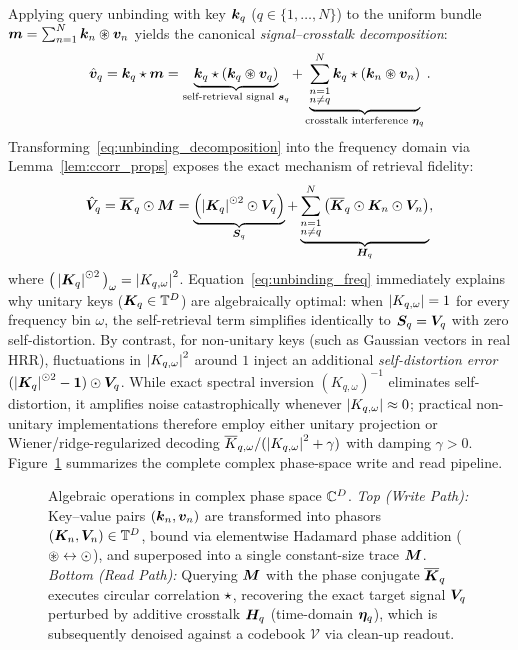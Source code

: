 Applying query unbinding with key $\boldsymbol{k}_q$ ($q \in \{1, \dots, N\}$) to the uniform bundle $\boldsymbol{m} = \sum_{n=1}^{N} \boldsymbol{k}_n \circledast \boldsymbol{v}_n$ yields the canonical \emph{signal--crosstalk decomposition}:
\begin{equation}\label{eq:unbinding_decomposition}
    \hat{\boldsymbol{v}}_q = \boldsymbol{k}_q \star \boldsymbol{m}
    = \underbrace{\boldsymbol{k}_q \star (\boldsymbol{k}_q \circledast \boldsymbol{v}_q)}_{\text{self-retrieval signal } \boldsymbol{s}_q}
    + \underbrace{\sum_{\substack{n=1 \\ n \neq q}}^{N} \boldsymbol{k}_q \star (\boldsymbol{k}_n \circledast \boldsymbol{v}_n)}_{\text{crosstalk interference } \boldsymbol{\eta}_q}.
\end{equation}
Transforming~\eqref{eq:unbinding_decomposition} into the frequency domain via Lemma~\ref{lem:ccorr_props} exposes the exact mechanism of retrieval fidelity:
\begin{equation}\label{eq:unbinding_freq}
    \hat{\boldsymbol{V}}_q = \overline{\boldsymbol{K}}_q \odot \boldsymbol{M}
    = \underbrace{\left(\left\lvert \boldsymbol{K}_q \right\rvert^{\odot 2} \odot \boldsymbol{V}_q\right)}_{\boldsymbol{S}_q}
    + \underbrace{\sum_{\substack{n=1 \\ n \neq q}}^{N} \left(\overline{\boldsymbol{K}}_q \odot \boldsymbol{K}_n \odot \boldsymbol{V}_n\right)}_{\boldsymbol{H}_q},
\end{equation}
where $\big(\left\lvert \boldsymbol{K}_q \right\rvert^{\odot 2}\big)_\omega = \left\lvert K_{q,\omega} \right\rvert^2$.
Equation~\eqref{eq:unbinding_freq} immediately explains why unitary keys ($\boldsymbol{K}_q \in \mathbb{T}^D$) are algebraically optimal: when $\left\lvert K_{q,\omega} \right\rvert = 1$ for every frequency bin $\omega$, the self-retrieval term simplifies identically to $\boldsymbol{S}_q = \boldsymbol{V}_q$ with zero self-distortion.
By contrast, for non-unitary keys (such as Gaussian vectors in real HRR), fluctuations in $\left\lvert K_{q,\omega} \right\rvert^2$ around $1$ inject an additional \emph{self-distortion error} $(\left\lvert \boldsymbol{K}_q \right\rvert^{\odot 2} - \boldsymbol{1}) \odot \boldsymbol{V}_q$.
While exact spectral inversion $(K_{q,\omega})^{-1}$ eliminates self-distortion, it amplifies noise catastrophically whenever $\left\lvert K_{q,\omega} \right\rvert \approx 0$; practical non-unitary implementations therefore employ either unitary projection or Wiener/ridge-regularized decoding $\overline{K}_{q,\omega} / (\left\lvert K_{q,\omega} \right\rvert^2 + \gamma)$ with damping $\gamma > 0$.
Figure~\ref{fig:algebra} summarizes the complete complex phase-space write and read pipeline.

\begin{figure}[tbp]
    \centering
    
    \caption{Algebraic operations in complex phase space $\mathbb{C}^D$. \emph{Top (Write Path):} Key--value pairs $(\boldsymbol{k}_n, \boldsymbol{v}_n)$ are transformed into phasors $(\boldsymbol{K}_n, \boldsymbol{V}_n) \in \mathbb{T}^D$, bound via elementwise Hadamard phase addition ($\circledast \leftrightarrow \odot$), and superposed into a single constant-size trace $\boldsymbol{M}$. \emph{Bottom (Read Path):} Querying $\boldsymbol{M}$ with the phase conjugate $\overline{\boldsymbol{K}}_q$ executes circular correlation $\star$, recovering the exact target signal $\boldsymbol{V}_q$ perturbed by additive crosstalk $\boldsymbol{H}_q$ (time-domain $\boldsymbol{\eta}_q$), which is subsequently denoised against a codebook $\mathcal{V}$ via clean-up readout.}
    \label{fig:algebra}
\end{figure}

